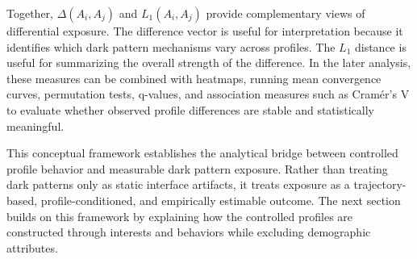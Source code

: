 Together, $\Delta(A_i, A_j)$ and $L_1(A_i, A_j)$ provide complementary views of differential exposure. The difference vector is useful for interpretation because it identifies which dark pattern mechanisms vary across profiles. The $L_1$ distance is useful for summarizing the overall strength of the difference. In the later analysis, these measures can be combined with heatmaps, running mean convergence curves, permutation tests, q-values, and association measures such as Cramér's V to evaluate whether observed profile differences are stable and statistically meaningful.

This conceptual framework establishes the analytical bridge between controlled profile behavior and measurable dark pattern exposure. Rather than treating dark patterns only as static interface artifacts, it treats exposure as a trajectory-based, profile-conditioned, and empirically estimable outcome. The next section builds on this framework by explaining how the controlled profiles are constructed through interests and behaviors while excluding demographic attributes.

